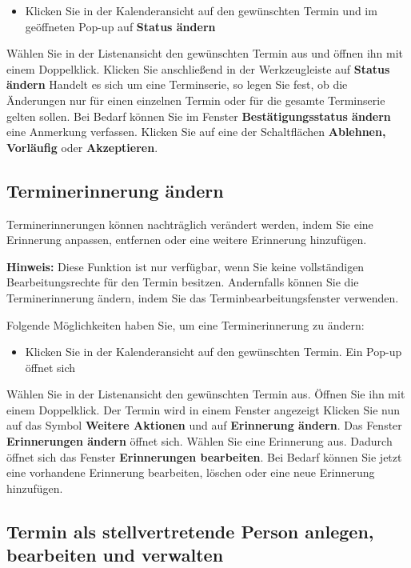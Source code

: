 \documentclass[
  letterpaper,
  DIV=11,
  numbers=noendperiod]{scrreprt}
\providecommand{\tightlist}{%
  \setlength{\itemsep}{0pt}\setlength{\parskip}{0pt}}\usepackage{longtable,booktabs,array}
\begin{document}
\begin{itemize}
\tightlist
\item
  Klicken Sie in der Kalenderansicht auf den gewünschten Termin und im
  geöffneten Pop-up auf \textbf{Status ändern}
\end{itemize}

Wählen Sie in der Listenansicht den gewünschten Termin aus und öffnen
ihn mit einem Doppelklick. Klicken Sie anschließend in der
Werkzeugleiste auf \textbf{Status ändern} Handelt es sich um eine
Terminserie, so legen Sie fest, ob die Änderungen nur für einen
einzelnen Termin oder für die gesamte Terminserie gelten sollen. Bei
Bedarf können Sie im Fenster \textbf{Bestätigungsstatus ändern} eine
Anmerkung verfassen. Klicken Sie auf eine der Schaltflächen
\textbf{Ablehnen, Vorläufig} oder \textbf{Akzeptieren}.

\subsection{Terminerinnerung ändern}\label{terminerinnerung-uxe4ndern}

Terminerinnerungen können nachträglich verändert werden, indem Sie eine
Erinnerung anpassen, entfernen oder eine weitere Erinnerung hinzufügen.

\textbf{Hinweis:} Diese Funktion ist nur verfügbar, wenn Sie keine
vollständigen Bearbeitungsrechte für den Termin besitzen. Andernfalls
können Sie die Terminerinnerung ändern, indem Sie das
Terminbearbeitungsfenster verwenden.

Folgende Möglichkeiten haben Sie, um eine Terminerinnerung zu ändern:

\begin{itemize}
\tightlist
\item
  Klicken Sie in der Kalenderansicht auf den gewünschten Termin. Ein
  Pop-up öffnet sich
\end{itemize}

Wählen Sie in der Listenansicht den gewünschten Termin aus. Öffnen Sie
ihn mit einem Doppelklick. Der Termin wird in einem Fenster angezeigt
Klicken Sie nun auf das Symbol \textbf{Weitere Aktionen} und auf
\textbf{Erinnerung ändern}. Das Fenster \textbf{Erinnerungen ändern}
öffnet sich. Wählen Sie eine Erinnerung aus. Dadurch öffnet sich das
Fenster \textbf{Erinnerungen bearbeiten}. Bei Bedarf können Sie jetzt
eine vorhandene Erinnerung bearbeiten, löschen oder eine neue Erinnerung
hinzufügen.

\subsection{Termin als stellvertretende Person anlegen, bearbeiten und
verwalten}\label{termin-als-stellvertretende-person-anlegen-bearbeiten-und-verwalten}
\end{document}
